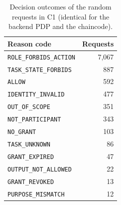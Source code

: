 \begin{table}[t]
\centering
\caption{Decision outcomes of the \COneN{} random requests in C1 (identical for the backend PDP and the chaincode).}
\label{tab:reasons}
\small
\begin{tabular}{lr}
\toprule
Reason code & Requests \\
\midrule
\texttt{ROLE\_FORBIDS\_ACTION} & 7,067 \\
\texttt{TASK\_STATE\_FORBIDS} & 887 \\
\texttt{ALLOW} & 592 \\
\texttt{IDENTITY\_INVALID} & 477 \\
\texttt{OUT\_OF\_SCOPE} & 351 \\
\texttt{NOT\_PARTICIPANT} & 343 \\
\texttt{NO\_GRANT} & 103 \\
\texttt{TASK\_UNKNOWN} & 86 \\
\texttt{GRANT\_EXPIRED} & 47 \\
\texttt{OUTPUT\_NOT\_ALLOWED} & 22 \\
\texttt{GRANT\_REVOKED} & 13 \\
\texttt{PURPOSE\_MISMATCH} & 12 \\
\bottomrule
\end{tabular}
\end{table}
